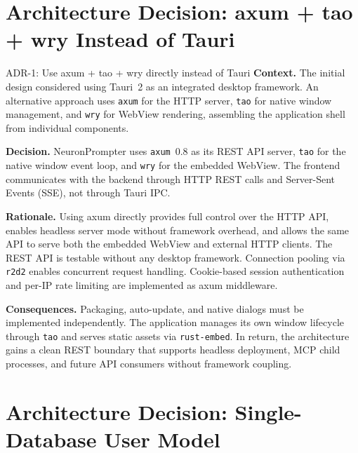 \documentclass[a4paper, 11pt, oneside]{report}
\begin{document}
\section{Architecture Decision: axum + tao + wry Instead of Tauri}
\label{sec:adr-framework}

\begin{adrbox}{ADR-1: Use axum + tao + wry directly instead of Tauri}
\textbf{Context.}\quad
The initial design considered using Tauri~2 as an integrated desktop
framework.  An alternative approach uses \texttt{axum} for the HTTP server,
\texttt{tao} for native window management, and \texttt{wry} for WebView
rendering, assembling the application shell from individual components.

\textbf{Decision.}\quad
NeuronPrompter uses \texttt{axum}~0.8 as its REST API server, \texttt{tao}
for the native window event loop, and \texttt{wry} for the embedded WebView.
The frontend communicates with the backend through HTTP REST calls and
Server-Sent Events (SSE), not through Tauri IPC.

\textbf{Rationale.}\quad
Using axum directly provides full control over the HTTP API, enables headless
server mode without framework overhead, and allows the same API to serve both
the embedded WebView and external HTTP clients.  The REST API is testable
without any desktop framework.  Connection pooling via \texttt{r2d2} enables
concurrent request handling.  Cookie-based session authentication and per-IP rate
limiting are implemented as axum middleware.

\textbf{Consequences.}\quad
Packaging, auto-update, and native dialogs must be implemented independently.
The application manages its own window lifecycle through \texttt{tao} and
serves static assets via \texttt{rust-embed}.  In return, the architecture
gains a clean REST boundary that supports headless deployment, MCP child
processes, and future API consumers without framework coupling.
\end{adrbox}

\section{Architecture Decision: Single-Database User Model}
\label{sec:adr-usermodel}
\end{document}
